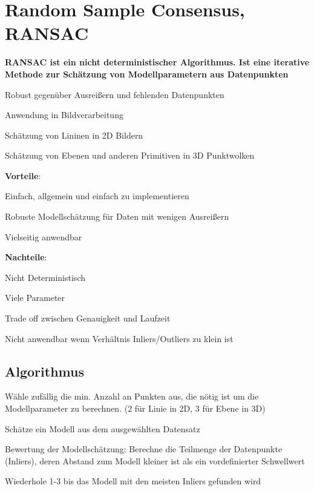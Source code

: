 \section{Random Sample Consensus, RANSAC}
\begin{compactitem}
    \item \textbf{RANSAC ist ein nicht deterministischer Algorithmus. Ist eine iterative
    Methode zur Schätzung von Modellparametern aus Datenpunkten}
    \item Robust gegenüber Ausreißern und fehlenden Datenpunkten
    \item Anwendung in  Bildverarbeitung
    \begin{compactitem}
        \item Schätzung von Lininen in 2D Bildern
        \item Schätzung von Ebenen und anderen Primitiven in 3D Punktwolken
    \end{compactitem}
    \item \textbf{Vorteile}:
    \begin{compactitem}
        \item Einfach, allgemein und einfach zu implementieren
        \item Robuste Modellschätzung für Daten mit wenigen Ausreißern
        \item Vielseitig anwendbar
    \end{compactitem}
    \item \textbf{Nachteile}:
    \begin{compactitem}
        \item Nicht Deterministisch
        \item Viele Parameter
        \item Trade off zwischen Genauigkeit und Laufzeit
        \item Nicht anwendbar wenn Verhältnis Inliers/Outliers zu klein ist
    \end{compactitem}
\end{compactitem}

\subsection{Algorithmus}
\begin{compactenum}
    \item Wähle zufällig die min. Anzahl an Punkten aus, die nötig ist um die
    Modellparameter zu berechnen. (2 für Linie in 2D, 3 für Ebene in 3D)
    \item Schätze ein Modell aus dem ausgewählten Datensatz
    \item Bewertung der Modellschätzung: Berechne die Teilmenge der Datenpunkte
    (Inliers), deren Abstand zum Modell kleiner ist als ein vordefinierter Schwellwert
    \item Wiederhole 1-3 bis das Modell mit den meisten Inliers gefunden wird
\end{compactenum}

